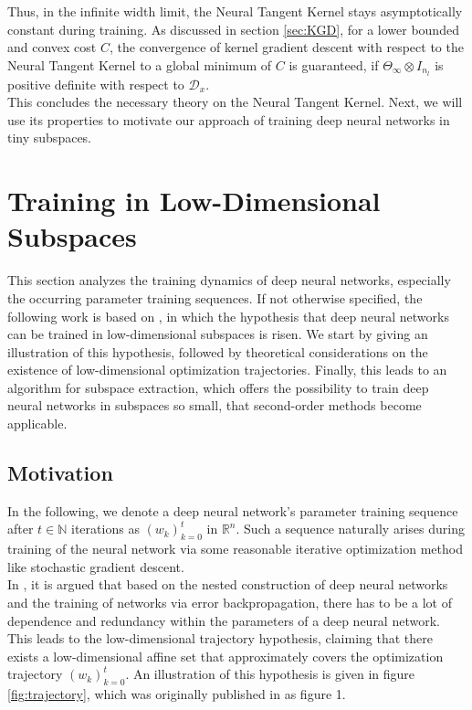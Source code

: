 \documentclass[11pt, a4paper]{article}
\newcommand{\N}{\mathbb{N}}
\newcommand{\R}{\mathbb{R}}
\newcommand{\D}{\mathcal{D}}
\begin{document}
Thus, in the infinite width limit, the Neural Tangent Kernel stays asymptotically constant during training. As discussed in section \ref{sec:KGD}, for a lower bounded and convex cost $C$, the convergence of kernel gradient descent with respect to the Neural Tangent Kernel to a global minimum of $C$ is guaranteed, if $\Theta_{\infty} \otimes I_{n_l}$ is positive definite with respect to $\D_x$. \\

This concludes the necessary theory on the Neural Tangent Kernel. Next, we will use its properties to motivate our approach of training deep neural networks in tiny subspaces.

\pagebreak
\section{Training in Low-Dimensional Subspaces} \label{sec:subspaces}

This section analyzes the training dynamics of deep neural networks, especially the occurring parameter training sequences.
If not otherwise specified, the following work is based on \cite{Paper}, in which the hypothesis that deep neural networks can be trained in low-dimensional subspaces is risen. We start by giving an illustration of this hypothesis, followed by theoretical considerations on the existence of low-dimensional optimization trajectories. Finally, this leads to an algorithm for subspace extraction, which offers the possibility to train deep neural networks in subspaces so small, that second-order methods become applicable.

\subsection{Motivation}

In the following, we denote a deep neural network's parameter training sequence after $t \in \N$ iterations as $(w_k)_{k=0}^t$ in $\R^n$. Such a sequence naturally arises during training of the neural network via some reasonable iterative optimization method like stochastic gradient descent. \\

In \cite{Paper}, it is argued that based on the nested construction of deep neural networks and the training of networks via error backpropagation, there has to be a lot of dependence and redundancy within the parameters of a deep neural network. This leads to the low-dimensional trajectory hypothesis, claiming that there exists a low-dimensional affine set that approximately covers the optimization trajectory $(w_k)_{k=0}^t$. An illustration of this hypothesis is given in figure \ref{fig:trajectory}, which was originally published in \cite{Paper} as figure 1.
\end{document}
